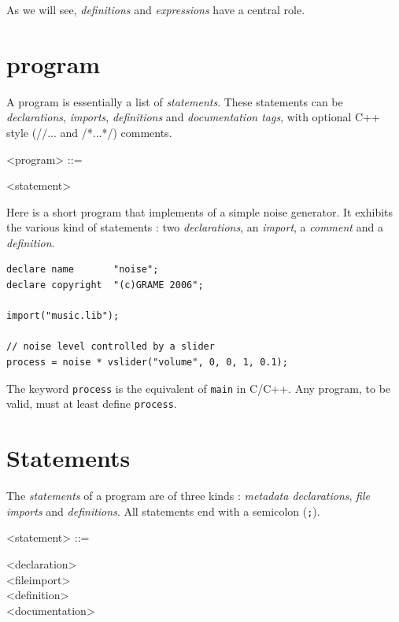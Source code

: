 \documentclass[a4paper,10pt]{book}
\begin{document}
As we will see, \textit{definitions} and \textit{expressions} have a central role.

\section{\faust program}

A \faust program is essentially a list of \textit{statements}. These statements can be \textit{declarations}, \textit{imports}, \textit{definitions} and \textit{documentation tags}, with optional C++ style (//... and /*...*/) comments.
 
\begin{grammar}
  <program> ::= 
  \begin{syntdiag}
    \begin{rep}
      <statement>
    \end{rep}
  \end{syntdiag}
\end{grammar}

Here is a short \faust program that implements of a simple noise generator. It exhibits the various kind of statements : two \textit{declarations}, an \textit{import}, a \textit{comment} and a \textit{definition}.

\begin{lstlisting}
declare name       "noise";
declare copyright  "(c)GRAME 2006";

import("music.lib");

// noise level controlled by a slider
process = noise * vslider("volume", 0, 0, 1, 0.1);
\end{lstlisting}
 
The keyword \lstinline'process' is the equivalent of \lstinline'main' in C/C++. Any \faust program, to be valid, must at least define \lstinline'process'.


\section{Statements}

The \textit{statements} of a \faust program are of three kinds : \textit{metadata declarations}, \textit{file imports} and \textit{definitions}. All statements end with a semicolon (\lstinline';'). 

\begin{grammar}
  <statement> ::= 
  \begin{syntdiag}
    \begin{stack}
      <declaration>\\
      <fileimport>\\
      <definition>\\
      <documentation>
    \end{stack}
  \end{syntdiag}
\end{grammar}
\end{document}
